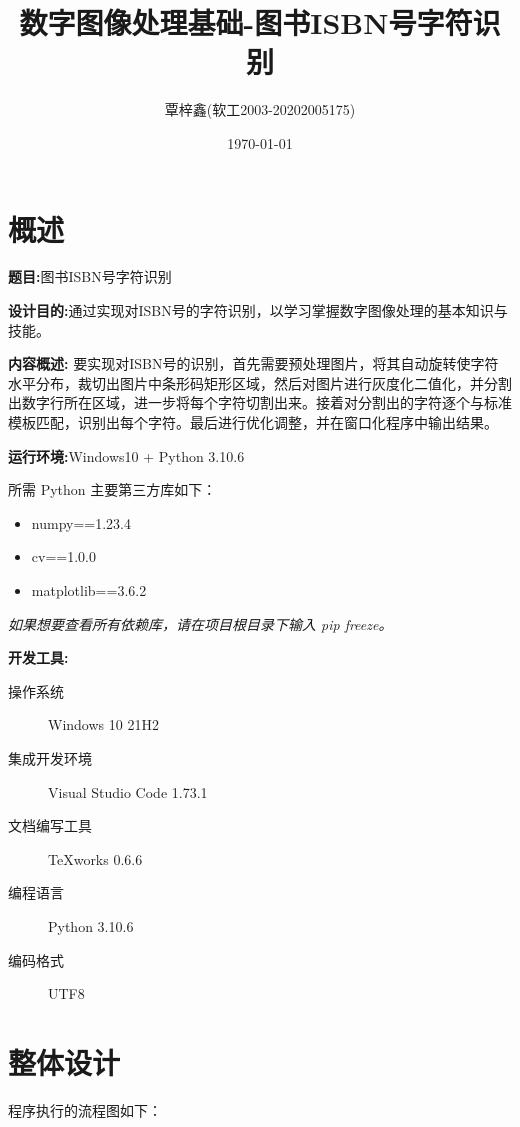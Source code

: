 \documentclass{ctexart}
\begin{document}
\title{数字图像处理基础-图书ISBN号字符识别}
\author{覃梓鑫(软工2003-20202005175)}
\date{\today}
\maketitle
\tableofcontents
\newpage
\section{概述}

\textbf{题目:}图书ISBN号字符识别

\textbf{设计目的:}通过实现对ISBN号的字符识别，以学习掌握数字图像处理的基本知识与技能。

\textbf{内容概述:}
要实现对ISBN号的识别，首先需要预处理图片，将其自动旋转使字符水平分布，裁切出图片中条形码矩形区域，然后对图片进行灰度化二值化，并分割出数字行所在区域，进一步将每个字符切割出来。接着对分割出的字符逐个与标准模板匹配，识别出每个字符。最后进行优化调整，并在窗口化程序中输出结果。

\textbf{运行环境:}Windows10 + Python 3.10.6

所需 Python 主要第三方库如下：
\begin{itemize}
    \item numpy==1.23.4
    \item cv==1.0.0
    \item matplotlib==3.6.2
\end{itemize}

\textit{如果想要查看所有依赖库，请在项目根目录下输入 pip freeze。 }

\textbf{开发工具:}%
\begin{description}
    \item[操作系统] Windows 10 21H2
    \item[集成开发环境] Visual Studio Code 1.73.1
    \item[文档编写工具] TeXworks 0.6.6
    \item[编程语言] Python 3.10.6
    \item[编码格式] UTF8
\end{description}

\section{整体设计}

程序执行的流程图如下：
\end{document}
